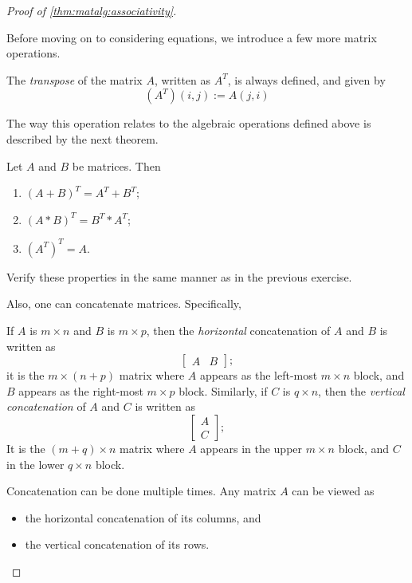 \documentclass{ximera}
\begin{document}
\begin{proof}[Proof of \ref{thm:matalg:associativity}]
\begin{exercise}
Before moving on to considering equations, we introduce a few more matrix operations.

\begin{definition} The {\it transpose} of the matrix $A$, written as $A^T$, is always defined, and given by
\[
\left(A^T\right)(i,j) := A(j,i)
\]
\end{definition}
The way this operation relates to the algebraic operations defined above is described by the next theorem.

\begin{theorem} Let $A$ and $B$ be matrices. Then
\begin{enumerate}
\item $(A+B)^T = A^T + B^T$;
\item $(A*B)^T = B^T*A^T$;
\item $\left(A^T\right)^T = A$.
\end{enumerate}
\end{theorem}

\begin{exercise} Verify these properties in the same manner as in the previous exercise.
\end{exercise}

Also, one can concatenate matrices. Specifically,

\begin{definition} If $A$ is $m\times n$ and $B$ is $m\times p$, then the {\it horizontal} concatenation of $A$ and $B$ is written as
\[
\begin{bmatrix} 
A & B
\end{bmatrix};
\] 
it is the $m\times (n+p)$ matrix where $A$ appears as the left-most $m\times n$ block, and $B$ appears as the right-most $m\times p$ block. Similarly, if $C$ is $q\times n$, then the {\it vertical concatenation} of $A$ and $C$ is written as
\[
\begin{bmatrix} 
A\\ C
\end{bmatrix};
\]
It is the $(m+q)\times n$ matrix where $A$ appears in the upper $m\times n$ block, and $C$ in the lower $q\times n$ block.
\end{definition}
Concatenation can be done multiple times. Any matrix $A$ can be viewed as 
\begin{itemize}
\item the horizontal concatenation of its columns, and
\item the vertical concatenation of its rows.
\end{itemize}


\end{exercise}
\end{proof}
\end{document}
